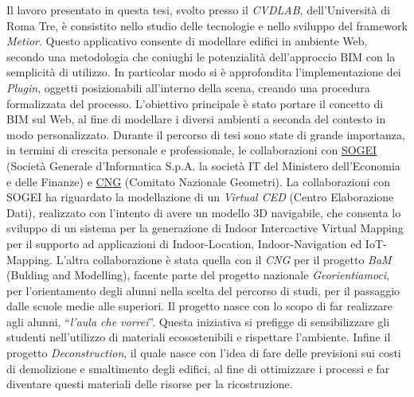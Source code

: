 Il lavoro presentato in questa tesi, svolto presso il \emph{CVDLAB},
dell'Università di Roma Tre, è consistito nello studio delle tecnologie e nello sviluppo del
framework \emph{Metior}.
Questo applicativo consente di modellare edifici in ambiente Web, secondo una metodologia che coniughi le potenzialità
dell’approccio BIM con la semplicità di utilizzo.
In particolar modo si è approfondita l'implementazione dei \emph{Plugin}, oggetti posizionabili all'interno della scena, creando
una procedura formalizzata del processo.
L'obiettivo principale è stato portare il concetto di BIM sul Web, al fine di modellare i diversi ambienti a seconda del
contesto in modo personalizzato.
Durante il percorso di tesi sono state di grande importanza, in termini di crescita personale e professionale,
le collaborazioni con \href{http://www.sogei.it/flex/cm/pages/ServeBLOB.php/L/IT/IDPagina/116}{SOGEI} (Società Generale d'Informatica S.p.A. la società IT del Ministero dell'Economia e delle Finanze)
e \href{http://www.cng.it/it/consiglio-nazionale}{CNG} (Comitato Nazionale Geometri).
La collaborazioni con SOGEI ha riguardato la modellazione di un \emph{Virtual CED} (Centro Elaborazione Dati),
realizzato con l'intento di avere un modello 3D navigabile, che consenta lo sviluppo di un sistema per
la generazione di Indoor Intercactive Virtual Mapping per il supporto ad applicazioni di Indoor-Location, Indoor-Navigation
ed IoT-Mapping.
L'altra collaborazione è stata quella con il \emph{CNG} per il progetto \emph{BaM}
(Bulding and Modelling),
facente parte del progetto nazionale \emph{Georientiamoci}, per l'orientamento degli alunni nella scelta del percorso di studi,
per il passaggio dalle scuole medie alle superiori.
Il progetto nasce con lo scopo di far realizzare agli alunni, ``\emph{l'aula che vorrei}''.
Questa iniziativa si prefigge di sensibilizzare gli studenti nell'utilizzo di
materiali ecosostenibili e rispettare l'ambiente.
Infine il progetto \emph{Deconstruction}, il quale nasce con l'idea di fare delle previsioni
sui costi di demolizione e smaltimento degli edifici, al fine di ottimizzare i processi e far
diventare questi materiali delle risorse per la ricostruzione.
